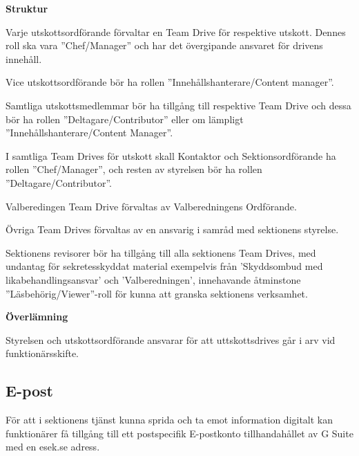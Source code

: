 \documentclass[10pt]{article}
\begin{document}
    \textbf{Struktur}
    \begin{dashlist}

    \item Varje utskottsordförande förvaltar en Team Drive för respektive utskott. Dennes roll ska vara ''Chef/Manager'' och har det övergipande ansvaret för drivens innehåll. 
    
    \item Vice utskottsordförande bör ha rollen ''Innehållshanterare/Content manager''. 

    \item Samtliga utskottsmedlemmar bör ha tillgång till respektive Team Drive och dessa bör ha rollen ''Deltagare/Contributor'' eller om lämpligt ''Innehållshanterare/Content Manager''. 
    
    \item I samtliga Team Drives för utskott skall Kontaktor och Sektionsordförande ha rollen ''Chef/Manager'', och resten av styrelsen bör ha rollen ''Deltagare/Contributor''.
    
    \item Valberedingen Team Drive förvaltas av Valberedningens Ordförande.
    
    \item Övriga Team Drives förvaltas av en ansvarig i samråd med sektionens styrelse. 

    \item Sektionens revisorer bör ha tillgång till alla sektionens Team Drives, med undantag för sekretesskyddat material exempelvis från 'Skyddsombud med likabehandlingsansvar' och 'Valberedningen', innehavande åtminstone ''Läsbehörig/Viewer''-roll för kunna att granska sektionens verksamhet. 
     
    \end{dashlist}
    
    \vspace{3px}
    \textbf{Överlämning}

    Styrelsen och utskottsordförande ansvarar för att uttskottsdrives går i arv vid funktionärsskifte.

    \vspace{10px}
    \subsection{E-post}
    \vspace{6px}

    För att i sektionens tjänst kunna sprida och ta emot information digitalt kan funktionärer få tillgång till ett postspecifik E-postkonto tillhandahållet av G Suite med en esek.se adress. 
\end{document}
